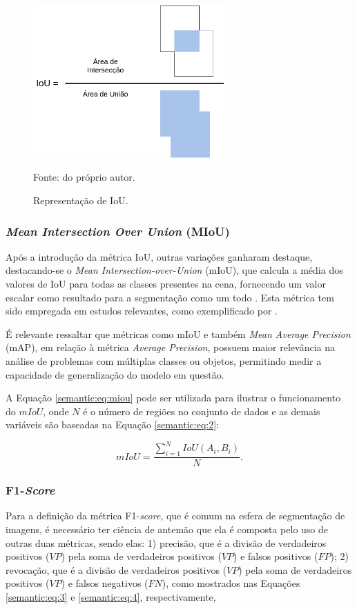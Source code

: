 \begin{figure}[H]
    \centering
    \caption{Representação de IoU.}
    \includegraphics[height=2.3in]{recursos/imagens/semantic/IoU.png}
    \label{semantic:fig:1}

    Fonte: do próprio autor.
\end{figure}

\subsubsection{\textit{Mean Intersection Over Union} (MIoU)}
\label{semantic:miou}
Após a introdução da métrica IoU, outras variações ganharam destaque, destacando-se o \textit{Mean Intersection-over-Union} (mIoU), que calcula a média dos valores de IoU para todas as classes presentes na cena, fornecendo um valor escalar como resultado para a segmentação como um todo \citep{Minaee2021}. Esta métrica tem sido empregada em estudos relevantes, como exemplificado por \cite{Mohan2020}.

É relevante ressaltar que métricas como mIoU e também \textit{Mean Average Precision} (mAP), em relação à métrica \textit{Average Precision}, possuem maior relevância na análise de problemas com múltiplas classes ou objetos, permitindo medir a capacidade de generalização do modelo em questão.

A Equação \ref{semantic:eq:miou} pode ser utilizada para ilustrar o funcionamento do $mIoU$, onde $N$ é o número de regiões no conjunto de dados e as demais variáveis são baseadas na Equação \ref{semantic:eq:2}:

\begin{equation}
    \label{semantic:eq:miou}
    mIoU = \frac{\sum_{i=1}^N IoU(A_i, B_i)}{N}.
\end{equation}

\subsubsection{F1-\textit{Score}}
\label{semantic:f1}
Para a definição da métrica F1-\textit{score}, que é comum na esfera de segmentação de imagens, é necessário ter ciência de antemão que ela é composta pelo uso de outras duas métricas, sendo elas: 1) precisão, que é a divisão de verdadeiros positivos ($VP$) pela soma de verdadeiros positivos ($VP$) e falsos positivos ($FP$); 2) revocação, que é a divisão de verdadeiros positivos ($VP$) pela soma de verdadeiros positivos ($VP$) e falsos negativos ($FN$), como mostrados nas Equações \ref{semantic:eq:3} e \ref{semantic:eq:4}, respectivamente,

